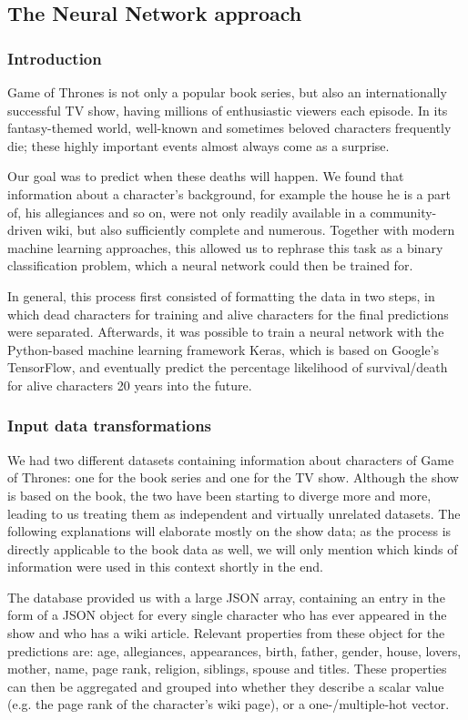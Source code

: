 \documentclass{bioinfo}
\begin{document}
\subsection{The Neural Network approach}

\subsubsection{Introduction}

Game of Thrones is not only a popular book series, but also an internationally successful TV show, having millions of enthusiastic viewers each episode. In its fantasy-themed world, well-known and sometimes beloved characters frequently die; these highly important events almost always come as a surprise.

Our goal was to predict when these deaths will happen. We found that information about a character's background, for example the house he is a part of, his allegiances and so on, were not only readily available in a community-driven wiki, but also sufficiently complete and numerous. Together with modern machine learning approaches, this allowed us to rephrase this task as a binary classification problem, which a neural network could then be trained for.

In general, this process first consisted of formatting the data in two steps, in which dead characters for training and alive characters for the final predictions were separated. Afterwards, it was possible to train a neural network with the Python-based machine learning framework Keras, which is based on Google's TensorFlow, and eventually predict the percentage likelihood of survival/death for alive characters 20 years into the future.

\subsubsection{Input data transformations}
We had two different datasets containing information about characters of Game of Thrones: one for the book series and one for the TV show. Although the show is based on the book, the two have been starting to diverge more and more, leading to us treating them as independent and virtually unrelated datasets. The following explanations will elaborate mostly on the show data; as the process is directly applicable to the book data as well, we will only mention which kinds of information were used in this context shortly in the end.

The database provided us with a large JSON array, containing an entry in the form of a JSON object for every single character who has ever appeared in the show and who has a wiki article. Relevant properties from these object for the predictions are: age, allegiances, appearances, birth, father, gender, house, lovers, mother, name, page rank, religion, siblings, spouse and titles. These properties can then be aggregated and grouped into whether they describe a scalar value (e.g. the page rank of the character's wiki page), or a one-/multiple-hot vector.
\end{document}
